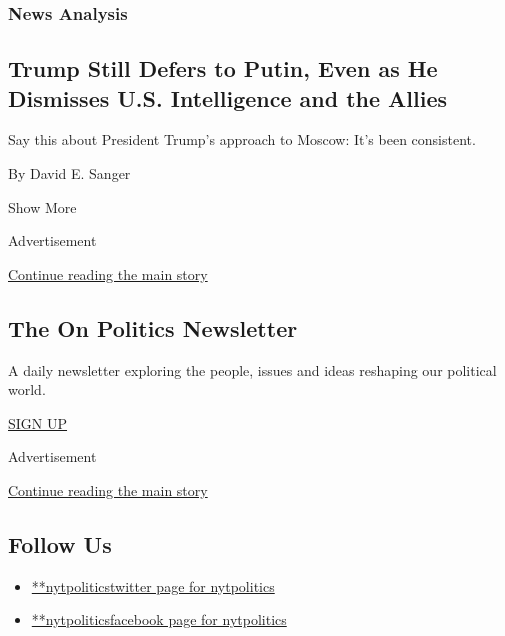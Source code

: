 \begin{enumerate}
  \hypertarget{news-analysis-1}{%
  \subsubsection{News Analysis}\label{news-analysis-1}}

  \hypertarget{trump-still-defers-to-putin-even-as-he-dismisses-us-intelligence-and-the-allies}{%
  \subsection{Trump Still Defers to Putin, Even as He Dismisses U.S.
  Intelligence and the
  Allies}\label{trump-still-defers-to-putin-even-as-he-dismisses-us-intelligence-and-the-allies}}

  Say this about President Trump's approach to Moscow: It's been
  consistent.

  By David E. Sanger
\end{enumerate}

Show More

Advertisement

\protect\hyperlink{after-mid2}{Continue reading the main story}

\hypertarget{the-on-politics-newsletter}{%
\subsection{The On Politics
Newsletter}\label{the-on-politics-newsletter}}

A daily newsletter exploring the people, issues and ideas reshaping our
political world.

\href{/newsletters/signup/CN}{SIGN UP}

Advertisement

\protect\hyperlink{after-mktg}{Continue reading the main story}

\hypertarget{follow-us}{%
\subsection{Follow Us}\label{follow-us}}

\begin{itemize}
\tightlist
\item
  \href{https://twitter.com/nytpolitics}{**nytpoliticstwitter page for
  nytpolitics}
\item
  \href{https://www.facebookcorewwwi.onion/nytpolitics}{**nytpoliticsfacebook
  page for nytpolitics}
\end{itemize}

